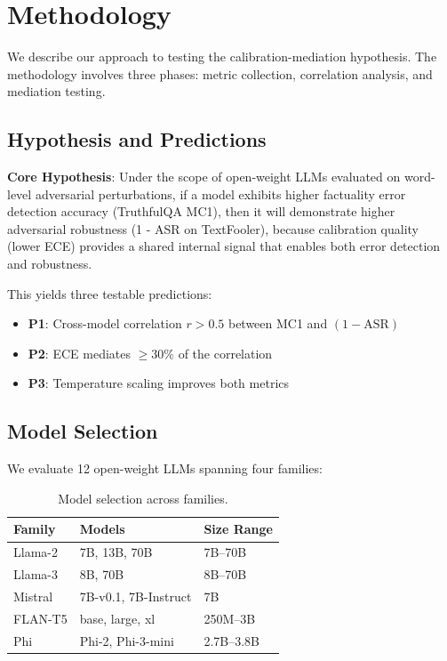 \section{Methodology}

We describe our approach to testing the calibration-mediation hypothesis. The methodology involves three phases: metric collection, correlation analysis, and mediation testing.

\subsection{Hypothesis and Predictions}

\textbf{Core Hypothesis}: Under the scope of open-weight LLMs evaluated on word-level adversarial perturbations, if a model exhibits higher factuality error detection accuracy (TruthfulQA MC1), then it will demonstrate higher adversarial robustness (1 - ASR on TextFooler), because calibration quality (lower ECE) provides a shared internal signal that enables both error detection and robustness.

This yields three testable predictions:

\begin{itemize}
    \item \textbf{P1}: Cross-model correlation $r > 0.5$ between MC1 and $(1-\text{ASR})$
    \item \textbf{P2}: ECE mediates $\geq 30\%$ of the correlation
    \item \textbf{P3}: Temperature scaling improves both metrics
\end{itemize}

\subsection{Model Selection}

We evaluate 12 open-weight LLMs spanning four families:

\begin{table}[t]
\centering
\caption{Model selection across families.}
\label{tab:models}
\begin{tabular}{@{}lll@{}}
\toprule
Family & Models & Size Range \\
\midrule
Llama-2 & 7B, 13B, 70B & 7B--70B \\
Llama-3 & 8B, 70B & 8B--70B \\
Mistral & 7B-v0.1, 7B-Instruct & 7B \\
FLAN-T5 & base, large, xl & 250M--3B \\
Phi & Phi-2, Phi-3-mini & 2.7B--3.8B \\
\bottomrule
\end{tabular}
\end{table}

